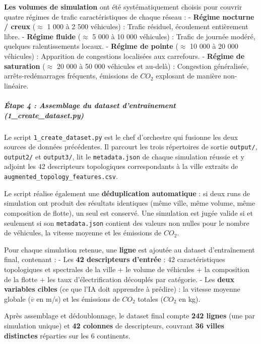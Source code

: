 \documentclass[10pt, a4paper]{article}
\begin{document}
\textbf{Les volumes de simulation} ont été systématiquement choisis pour
couvrir quatre régimes de trafic caractéristiques de chaque réseau : -
\textbf{Régime nocturne / creux} (\(\approx\) 1 000 à 2 500 véhicules) :
Trafic résiduel, écoulement entièrement libre. - \textbf{Régime fluide}
(\(\approx\) 5 000 à 10 000 véhicules) : Trafic de journée modéré,
quelques ralentissements locaux. - \textbf{Régime de pointe}
(\(\approx\) 10 000 à 20 000 véhicules) : Apparition de congestions
localisées aux carrefours. - \textbf{Régime de saturation} (\(\approx\)
20 000 à 50 000 véhicules et au-delà) : Congestion généralisée,
arrêts-redémarrages fréquents, émissions de \(CO_2\) explosant de
manière non-linéaire.

\subparagraph{Étape 4 : Assemblage du dataset d'entraînement
(1\_create\_dataset.py)}\label{uxe9tape-4-assemblage-du-dataset-dentrauxeenement-1_create_dataset.py}

Le script \texttt{1\_create\_dataset.py} est le chef d'orchestre qui
fusionne les deux sources de données précédentes. Il parcourt les trois
répertoires de sortie \texttt{output/}, \texttt{output2/} et
\texttt{output3/}, lit le \texttt{metadata.json} de chaque simulation
réussie et y adjoint les 42 descripteurs topologiques correspondants à
la ville extraits de \texttt{augmented\_topology\_features.csv}.

Le script réalise également une \textbf{déduplication automatique} : si
deux runs de simulation ont produit des résultats identiques (même
ville, même volume, même composition de flotte), un seul est conservé.
Une simulation est jugée valide si et seulement si son
\texttt{metadata.json} contient des valeurs non nulles pour le nombre de
véhicules, la vitesse moyenne et les émissions de \(CO_2\).

Pour chaque simulation retenue, une \textbf{ligne} est ajoutée au
dataset d'entraînement final, contenant : - Les \textbf{42 descripteurs
d'entrée} : 42 caractéristiques topologiques et spectrales de la ville +
le volume de véhicules + la composition de la flotte + les taux
d'électrification découplés par catégorie. - Les \textbf{deux variables
cibles} (ce que l'IA doit apprendre à prédire) : la vitesse moyenne
globale (\(\overline{v}\) en m/s) et les émissions de \(CO_2\) totales
(\(CO_2\) en kg).

Après assemblage et dédoublonnage, le dataset final compte \textbf{242
lignes} (une par simulation unique) et \textbf{42 colonnes} de
descripteurs, couvrant \textbf{36 villes distinctes} réparties sur les 6
continents.
\end{document}
